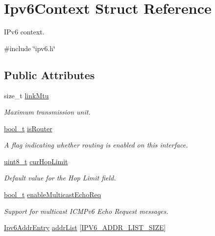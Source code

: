 \hypertarget{structIpv6Context}{}\section{Ipv6\+Context Struct Reference}
\label{structIpv6Context}


I\+Pv6 context.  




{\ttfamily \#include \char`\"{}ipv6.\+h\char`\"{}}

\subsection*{Public Attributes}
\begin{DoxyCompactItemize}
\item 
size\+\_\+t \hyperlink{structIpv6Context_a4de9c20bbf842626f4efa346cbb221c6}{link\+Mtu}
\begin{DoxyCompactList}\small\item\em Maximum transmission unit. \end{DoxyCompactList}\item 
\hyperlink{compiler__port_8h_a812d16e5494522586b3784e55d479912}{bool\+\_\+t} \hyperlink{structIpv6Context_a1c7066fcc3c82e99dc3ab7ff66db78fb}{is\+Router}
\begin{DoxyCompactList}\small\item\em A flag indicating whether routing is enabled on this interface. \end{DoxyCompactList}\item 
\hyperlink{stdint_8h_aba7bc1797add20fe3efdf37ced1182c5}{uint8\+\_\+t} \hyperlink{structIpv6Context_aa1455c2834bc2547cde11287f2e99aca}{cur\+Hop\+Limit}
\begin{DoxyCompactList}\small\item\em Default value for the Hop Limit field. \end{DoxyCompactList}\item 
\hyperlink{compiler__port_8h_a812d16e5494522586b3784e55d479912}{bool\+\_\+t} \hyperlink{structIpv6Context_ae7dca5b9f205007c192e8e2322ae713d}{enable\+Multicast\+Echo\+Req}
\begin{DoxyCompactList}\small\item\em Support for multicast I\+C\+M\+Pv6 Echo Request messages. \end{DoxyCompactList}\item 
\hyperlink{structIpv6AddrEntry}{Ipv6\+Addr\+Entry} \hyperlink{structIpv6Context_ac5e6fa6ff4474f9c4cbde174b60d497d}{addr\+List} \mbox{[}\hyperlink{ipv6_8h_aa9064306086cc3bba39cf75db3ec2881}{I\+P\+V6\+\_\+\+A\+D\+D\+R\+\_\+\+L\+I\+S\+T\+\_\+\+S\+I\+ZE}\mbox{]}

\end{DoxyCompactItemize}
